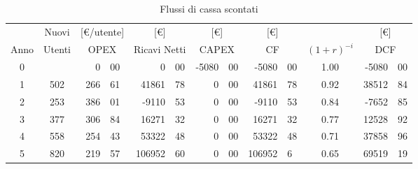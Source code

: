 \begin{table}[!h]
\begin{adjustbox}{width=\textwidth}
\begin{tabular}{c|c|r@{.}l|r@{.}l|r@{.}l|r@{.}l|c|r@{.}l}
& Nuovi 
& \multicolumn{2}{|c}{[\euro/utente]}
& \multicolumn{2}{|c}{[\euro]}
& \multicolumn{2}{|c}{[\euro]}
& \multicolumn{2}{|c|}{[\euro]}
& 
& \multicolumn{2}{|c}{[\euro]}
\\
Anno
& Utenti
& \multicolumn{2}{|c}{OPEX}
& \multicolumn{2}{|c}{Ricavi Netti}
& \multicolumn{2}{|c}{CAPEX}
& \multicolumn{2}{|c|}{CF}
& $(1+r)^{-i}$
& \multicolumn{2}{|c}{DCF}
\\

\hline
0 &      &   0&00 &      0&00 & -5080&00&  -5080&00 &1.00& -5080&00 \\
1 & 502  & 266&61 &  41861&78 &     0&00&  41861&78 &0.92& 38512&84 \\ 
2 & 253  & 386&01 &  -9110&53 &     0&00&  -9110&53 &0.84& -7652&85 \\
3 & 377  & 306&84 &  16271&32 &     0&00&  16271&32 &0.77& 12528&92 \\
4 & 558  & 254&43 &  53322&48 &     0&00&  53322&48 &0.71& 37858&96 \\
5 & 820  & 219&57 & 106952&60 &     0&00& 106952&6  &0.65& 69519&19
\end{tabular}
\end{adjustbox}
\caption{Flussi di cassa scontati}
\label{tab:dcf}
\end{table}

 




